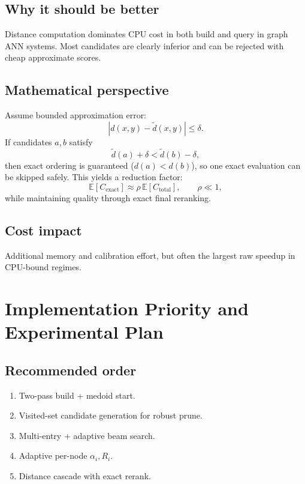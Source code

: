 \documentclass[11pt]{article}
\begin{document}
\subsection{Why it should be better}
Distance computation dominates CPU cost in both build and query in graph ANN systems. Most candidates are clearly inferior and can be rejected with cheap approximate scores.

\subsection{Mathematical perspective}
Assume bounded approximation error:
\begin{equation}
|d(x,y)-\tilde d(x,y)|\le \delta.
\end{equation}
If candidates $a,b$ satisfy
\begin{equation}
\tilde d(a)+\delta < \tilde d(b)-\delta,
\end{equation}
then exact ordering is guaranteed ($d(a)<d(b)$), so one exact evaluation can be skipped safely. This yields a reduction factor:
\begin{equation}
\mathbb{E}[C_{\text{exact}}] \approx \rho\,\mathbb{E}[C_{\text{total}}],\qquad \rho\ll 1,
\end{equation}
while maintaining quality through exact final reranking.

\subsection{Cost impact}
Additional memory and calibration effort, but often the largest raw speedup in CPU-bound regimes.

\section{Implementation Priority and Experimental Plan}

\subsection{Recommended order}
\begin{enumerate}[leftmargin=*]
    \item Two-pass build + medoid start.
    \item Visited-set candidate generation for robust prune.
    \item Multi-entry + adaptive beam search.
    \item Adaptive per-node $\alpha_i, R_i$.
    \item Distance cascade with exact rerank.
\end{enumerate}
\end{document}
